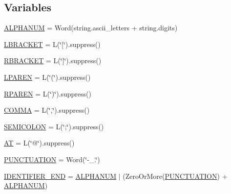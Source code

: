 \subsection*{Variables}
\begin{DoxyCompactItemize}
\item 
\hyperlink{namespacesetuptools_1_1__vendor_1_1packaging_1_1requirements_a24fd8a5c9ee94835ecf93d35d824b5b8}{A\+L\+P\+H\+A\+N\+UM} = Word(string.\+ascii\+\_\+letters + string.\+digits)
\item 
\hyperlink{namespacesetuptools_1_1__vendor_1_1packaging_1_1requirements_a3873509915a8e27d0002c7bd5da34a6a}{L\+B\+R\+A\+C\+K\+ET} = L(\char`\"{}\mbox{[}\char`\"{}).suppress()
\item 
\hyperlink{namespacesetuptools_1_1__vendor_1_1packaging_1_1requirements_a9c896f4d3039fa73f0d4b7a23cded6cd}{R\+B\+R\+A\+C\+K\+ET} = L(\char`\"{}\mbox{]}\char`\"{}).suppress()
\item 
\hyperlink{namespacesetuptools_1_1__vendor_1_1packaging_1_1requirements_a0feb7b2144b9effae56e946cb365c4d4}{L\+P\+A\+R\+EN} = L(\char`\"{}(\char`\"{}).suppress()
\item 
\hyperlink{namespacesetuptools_1_1__vendor_1_1packaging_1_1requirements_a7acdc3bbcbb68c9d83302e9e3feff78b}{R\+P\+A\+R\+EN} = L(\char`\"{})\char`\"{}).suppress()
\item 
\hyperlink{namespacesetuptools_1_1__vendor_1_1packaging_1_1requirements_abd9638ad1381e6b562c8e84369bc394e}{C\+O\+M\+MA} = L(\char`\"{},\char`\"{}).suppress()
\item 
\hyperlink{namespacesetuptools_1_1__vendor_1_1packaging_1_1requirements_a31fea56c8581014a0444b509f2739426}{S\+E\+M\+I\+C\+O\+L\+ON} = L(\char`\"{};\char`\"{}).suppress()
\item 
\hyperlink{namespacesetuptools_1_1__vendor_1_1packaging_1_1requirements_a4d75318700123aaa4f1c8dd9516aad55}{AT} = L(\char`\"{}@\char`\"{}).suppress()
\item 
\hyperlink{namespacesetuptools_1_1__vendor_1_1packaging_1_1requirements_a510664ef9607be3176a2f01c5747e91b}{P\+U\+N\+C\+T\+U\+A\+T\+I\+ON} = Word(\char`\"{}-\/\+\_\+.\char`\"{})
\item 
\hyperlink{namespacesetuptools_1_1__vendor_1_1packaging_1_1requirements_a0f5dc557ab895ef7aa10418674fa201f}{I\+D\+E\+N\+T\+I\+F\+I\+E\+R\+\_\+\+E\+ND} = \hyperlink{namespacesetuptools_1_1__vendor_1_1packaging_1_1requirements_a24fd8a5c9ee94835ecf93d35d824b5b8}{A\+L\+P\+H\+A\+N\+UM} $\vert$ (Zero\+Or\+More(\hyperlink{namespacesetuptools_1_1__vendor_1_1packaging_1_1requirements_a510664ef9607be3176a2f01c5747e91b}{P\+U\+N\+C\+T\+U\+A\+T\+I\+ON}) + \hyperlink{namespacesetuptools_1_1__vendor_1_1packaging_1_1requirements_a24fd8a5c9ee94835ecf93d35d824b5b8}{A\+L\+P\+H\+A\+N\+UM})

\end{DoxyCompactItemize}
